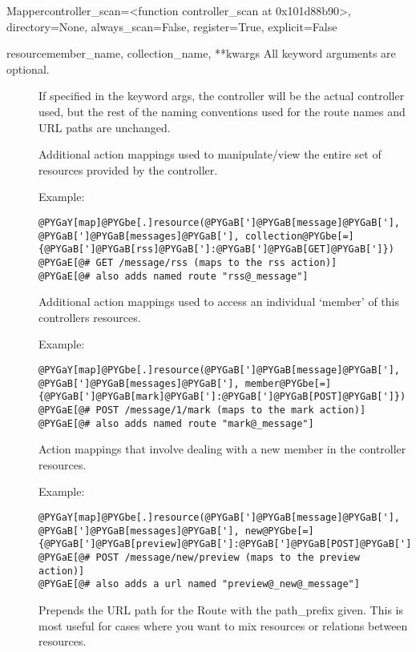 \documentclass[letterpaper,10pt,english]{manual}
\begin{document}
\begin{classdesc}{Mapper}{controller\_scan=\textless{}function controller\_scan at 0x101d88b90\textgreater{}, directory=None, always\_scan=False, register=True, explicit=False}
\begin{methoddesc}{resource}{member\_name, collection\_name, **kwargs}
All keyword arguments are optional.
\begin{description}
\item[]
If specified in the keyword args, the controller will be
the actual controller used, but the rest of the naming
conventions used for the route names and URL paths are
unchanged.

\item[]
Additional action mappings used to manipulate/view the
entire set of resources provided by the controller.

Example:

\begin{Verbatim}[commandchars=@\[\]]
@PYGaY[map]@PYGbe[.]resource(@PYGaB[']@PYGaB[message]@PYGaB['], @PYGaB[']@PYGaB[messages]@PYGaB['], collection@PYGbe[=]{@PYGaB[']@PYGaB[rss]@PYGaB[']:@PYGaB[']@PYGaB[GET]@PYGaB[']})
@PYGaE[@# GET /message/rss (maps to the rss action)]
@PYGaE[@# also adds named route "rss@_message"]
\end{Verbatim}

\item[]
Additional action mappings used to access an individual
`member' of this controllers resources.

Example:

\begin{Verbatim}[commandchars=@\[\]]
@PYGaY[map]@PYGbe[.]resource(@PYGaB[']@PYGaB[message]@PYGaB['], @PYGaB[']@PYGaB[messages]@PYGaB['], member@PYGbe[=]{@PYGaB[']@PYGaB[mark]@PYGaB[']:@PYGaB[']@PYGaB[POST]@PYGaB[']})
@PYGaE[@# POST /message/1/mark (maps to the mark action)]
@PYGaE[@# also adds named route "mark@_message"]
\end{Verbatim}

\item[]
Action mappings that involve dealing with a new member in
the controller resources.

Example:

\begin{Verbatim}[commandchars=@\[\]]
@PYGaY[map]@PYGbe[.]resource(@PYGaB[']@PYGaB[message]@PYGaB['], @PYGaB[']@PYGaB[messages]@PYGaB['], new@PYGbe[=]{@PYGaB[']@PYGaB[preview]@PYGaB[']:@PYGaB[']@PYGaB[POST]@PYGaB[']})
@PYGaE[@# POST /message/new/preview (maps to the preview action)]
@PYGaE[@# also adds a url named "preview@_new@_message"]
\end{Verbatim}

\item[]
Prepends the URL path for the Route with the path\_prefix
given. This is most useful for cases where you want to mix
resources or relations between resources.


\end{description}
\end{methoddesc}
\end{classdesc}
\end{document}

